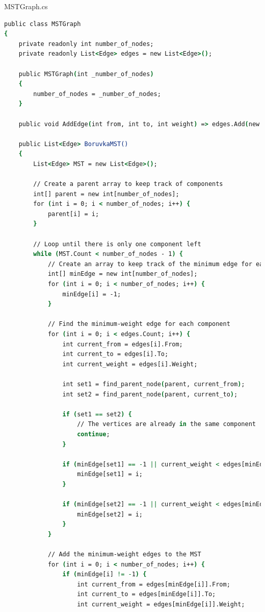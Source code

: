 \documentclass[11pt]{article}
\begin{document}
\medbreak\noindent
MSTGraph.cs
\begin{lstlisting}[language=csh]
public class MSTGraph
{
    private readonly int number_of_nodes;
    private readonly List<Edge> edges = new List<Edge>();

    public MSTGraph(int _number_of_nodes)
    {
        number_of_nodes = _number_of_nodes;
    }

    public void AddEdge(int from, int to, int weight) => edges.Add(new Edge(from, to, weight));

    public List<Edge> BoruvkaMST()
    {
        List<Edge> MST = new List<Edge>();

        // Create a parent array to keep track of components
        int[] parent = new int[number_of_nodes];
        for (int i = 0; i < number_of_nodes; i++) {
            parent[i] = i;
        }

        // Loop until there is only one component left
        while (MST.Count < number_of_nodes - 1) {
            // Create an array to keep track of the minimum edge for each component
            int[] minEdge = new int[number_of_nodes];
            for (int i = 0; i < number_of_nodes; i++) {
                minEdge[i] = -1;
            }

            // Find the minimum-weight edge for each component
            for (int i = 0; i < edges.Count; i++) {
                int current_from = edges[i].From;
                int current_to = edges[i].To;
                int current_weight = edges[i].Weight;

                int set1 = find_parent_node(parent, current_from);
                int set2 = find_parent_node(parent, current_to);

                if (set1 == set2) {
                    // The vertices are already in the same component
                    continue;
                }

                if (minEdge[set1] == -1 || current_weight < edges[minEdge[set1]].Weight) {
                    minEdge[set1] = i;
                }

                if (minEdge[set2] == -1 || current_weight < edges[minEdge[set2]].Weight) {
                    minEdge[set2] = i;
                }
            }

            // Add the minimum-weight edges to the MST
            for (int i = 0; i < number_of_nodes; i++) {
                if (minEdge[i] != -1) {
                    int current_from = edges[minEdge[i]].From;
                    int current_to = edges[minEdge[i]].To;
                    int current_weight = edges[minEdge[i]].Weight;


\end{lstlisting}
\end{document}
